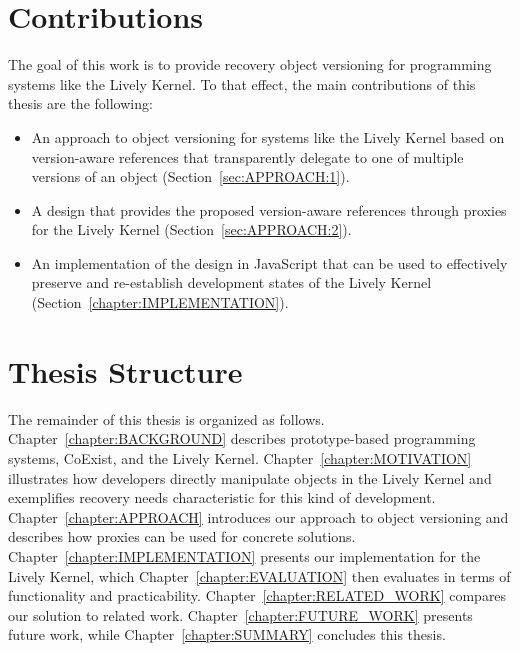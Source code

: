 \section{Contributions}

The goal of this work is to provide recovery object versioning for programming systems like the Lively Kernel.
To that effect, the main contributions of this thesis are the following:

\begin{itemize}
    \item An approach to object versioning for systems like the Lively Kernel based on version-aware references that transparently delegate to one of multiple versions of an object (Section~\ref{sec:APPROACH:1}).
    \item A design that provides the proposed version-aware references through proxies for the Lively Kernel (Section~\ref{sec:APPROACH:2}).
    \item An implementation of the design in JavaScript that can be used to effectively preserve and re-establish development states of the Lively Kernel (Section~\ref{chapter:IMPLEMENTATION}).
\end{itemize}


\section{Thesis Structure}

The remainder of this thesis is organized as follows. 
Chapter~\ref{chapter:BACKGROUND} describes prototype-based programming systems, CoExist, and the Lively Kernel.
Chapter~\ref{chapter:MOTIVATION} illustrates how developers directly manipulate objects in the Lively Kernel and exemplifies recovery needs characteristic for this kind of development.
Chapter~\ref{chapter:APPROACH} introduces our approach to object versioning and describes how proxies can be used for concrete solutions.
Chapter~\ref{chapter:IMPLEMENTATION} presents our implementation for the Lively Kernel, which Chapter~\ref{chapter:EVALUATION} then evaluates in terms of functionality and practicability.
Chapter~\ref{chapter:RELATED_WORK} compares our solution to related work.
Chapter~\ref{chapter:FUTURE_WORK} presents future work, while Chapter~\ref{chapter:SUMMARY} concludes this thesis.

